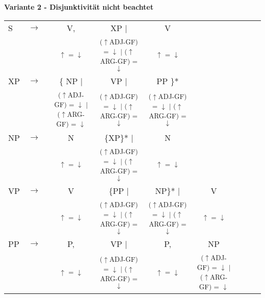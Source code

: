 \documentclass[12pt,a4paper]{article}
\begin{document}
\textbf{Variante 2 - Disjunktivität nicht beachtet}
\begin{singlespace}
\begin{tabular}{ l  l  c  c  c  c  c  c  c}
S & $\rightarrow$ & V, & XP $\mid$ & V \\
   & $\qquad$ & \textsuperscript{$\uparrow$ = $\downarrow$} & \textsuperscript{($\uparrow$ADJ-GF) = $\downarrow$ $\mid$ ($\uparrow$ARG-GF) = $\downarrow$} &  \textsuperscript{$\uparrow$ = $\downarrow$} \\
XP & $\rightarrow$ & \{ NP $\mid$ &  VP $\mid$ & PP \}* \\
   & $\qquad$ & \textsuperscript{($\uparrow$ADJ-GF) = $\downarrow$ $\mid$ ($\uparrow$ARG-GF) = $\downarrow$} &\textsuperscript{($\uparrow$ADJ-GF) = $\downarrow$ $\mid$ ($\uparrow$ARG-GF) = $\downarrow$} & \textsuperscript{($\uparrow$ADJ-GF) = $\downarrow$ $\mid$ ($\uparrow$ARG-GF) = $\downarrow$} \\
   NP & $\rightarrow$ & N &  \{XP\}* $\mid$ & N \\
   & $\qquad$ & \textsuperscript{$\uparrow$ = $\downarrow$}  & \textsuperscript{($\uparrow$ADJ-GF) = $\downarrow$ $\mid$ ($\uparrow$ARG-GF) = $\downarrow$} & \textsuperscript{$\uparrow$ = $\downarrow$}\\
VP & $\rightarrow$ & V  & \{PP $\mid$     & NP\}* $\mid$ & V \\
   & $\qquad$ & \textsuperscript{$\uparrow$ = $\downarrow$} & \textsuperscript{($\uparrow$ADJ-GF) = $\downarrow$ $\mid$ ($\uparrow$ARG-GF) = $\downarrow$} & \textsuperscript{($\uparrow$ADJ-GF) = $\downarrow$ $\mid$ ($\uparrow$ARG-GF) = $\downarrow$} & \textsuperscript{$\uparrow$ = $\downarrow$}\\
   PP & $\rightarrow$ & P, & VP $\mid$  & P,   & NP \\
   & $\qquad$ & \textsuperscript{$\uparrow$ = $\downarrow$} & \textsuperscript{($\uparrow$ADJ-GF) = $\downarrow$ $\mid$ ($\uparrow$ARG-GF) = $\downarrow$} & \textsuperscript{$\uparrow$ = $\downarrow$} & \textsuperscript{($\uparrow$ADJ-GF) = $\downarrow$ $\mid$ ($\uparrow$ARG-GF) = $\downarrow$}\\
\end{tabular}\\
\newline
\newline
\newline
\newline
\end{singlespace}
\end{document}
